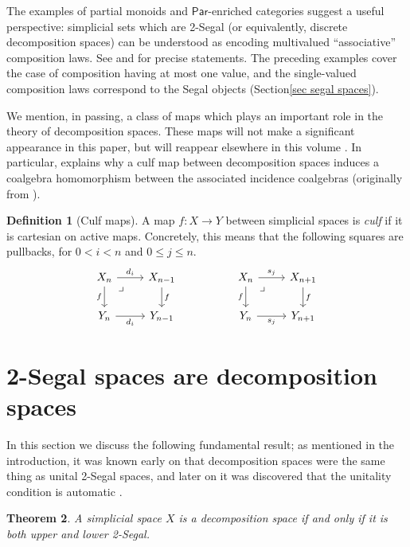 \documentclass{conm-p-l}
\newtheorem{theorem}{Theorem}[section]
\theoremstyle{definition}
\newtheorem{definition}[theorem]{Definition}
\theoremstyle{remark}
\newcommand{\catpar}{\mathsf{Par}}
\begin{document}
The examples of partial monoids and $\catpar$-enriched categories suggest a useful perspective: simplicial sets which are 2-Segal (or equivalently, discrete decomposition spaces) can be understood as encoding multivalued ``associative'' composition laws.
See \cite[\S3.3]{DyckerhoffKapranov:HSS} and \cite{Stern:BIRS} for precise statements.
The preceding examples cover the case of composition having at most one value, and the single-valued composition laws correspond to the Segal objects (Section\nobreakspace \ref {sec segal spaces}).

We mention, in passing, a class of maps which plays an important role in the theory of decomposition spaces.
These maps will not make a significant appearance in this paper, but will reappear elsewhere in this volume \cite{CooperYoung:BIRS,GKT:DSC}.
In particular, \cite{CooperYoung:BIRS} explains why a culf map between decomposition spaces induces a coalgebra homomorphism between the associated incidence coalgebras (originally from \cite[Lemma 8.2]{GKT1}).

\begin{definition}[Culf maps]\label{def culf}
A map $f \colon X \to Y$ between simplicial spaces is \emph{culf} if it is cartesian on active maps.
Concretely, this means that the following squares are pullbacks, for $0 < i < n$ and $0\leq j \leq n$.
\[ \begin{tikzcd}
X_n \rar{d_i} \dar[swap]{f} \ar[dr, phantom, "\lrcorner" very near start]  & X_{n-1} \dar{f} 
& &
X_n \rar{s_j} \dar[swap]{f} \ar[dr, phantom, "\lrcorner" very near start]  & X_{n+1} \dar{f} 
\\
Y_n  \rar[swap]{d_i} & Y_{n-1} 
& &
Y_n  \rar[swap]{s_j} & Y_{n+1}
\end{tikzcd}
\]
\end{definition}

\section{2-Segal spaces are decomposition spaces}\label{sec 2-Segl decomp}

In this section we discuss the following fundamental result; as mentioned in the introduction, it was known early on that decomposition spaces were the same thing as unital 2-Segal spaces, and later on it was discovered that the unitality condition is automatic \cite{Feller_et_al:E2SSU}.

\begin{theorem}\label{thm unitality} 
A simplicial space $X$ is a decomposition space if and only if it is both upper and lower 2-Segal.
\end{theorem}
\end{document}
